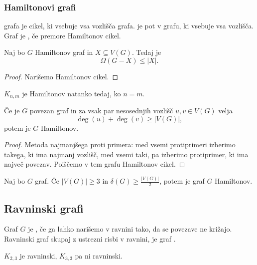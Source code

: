 \subsubsection{Hamiltonovi grafi}
\begin{definicija}
     grafa je cikel, ki vsebuje vsa vozlišča grafa.  je pot v grafu, ki vsebuje vsa vozlišča. Graf je , če premore Hamiltonov cikel.
\end{definicija}

\begin{izrek}
    Naj bo $G$ Hamiltonov graf in $X \subseteq V(G)$. Tedaj je $$\Omega(G-X) \leq |X|.$$
\end{izrek}

\begin{proof}
    Narišemo Hamiltonov cikel.
\end{proof}

\begin{primer}
    $K_{n,m}$ je Hamiltonov natanko tedaj, ko $n=m$.
\end{primer}

\begin{izrek}[Ore]
    Če je $G$ povezan graf in za vsak par nesosednjih vozlišč $u, v \in V(G)$ velja $$\deg(u)+\deg(v) \geq |V(G)|,$$ potem je $G$ Hamiltonov.
\end{izrek}

\begin{proof}
    Metoda najmanjšega proti primera: med vsemi protiprimeri izberimo takega, ki ima najmanj vozlišč, med vsemi taki, pa izberimo protiprimer, ki ima največ povezav. Poiščemo v tem grafu Hamiltonov cikel.
\end{proof}

\begin{izrek}[Dirac]
    Naj bo $G$ graf. Če $|V(G)| \geq 3$ in $\delta(G) \geq \frac{|V(G)|}{2}$, potem je graf $G$ Hamiltonov.
\end{izrek}

\subsection{Ravninski grafi}
\begin{definicija}
    Graf $G$ je , če ga lahko narišemo v ravnini tako, da se povezave ne križajo. Ravninski graf skupaj z ustrezni risbi v ravnini, je graf .
\end{definicija}

\begin{primer}
    $K_{2,3}$ je ravninski, $K_{3,3}$ pa ni ravninski.
\end{primer}

